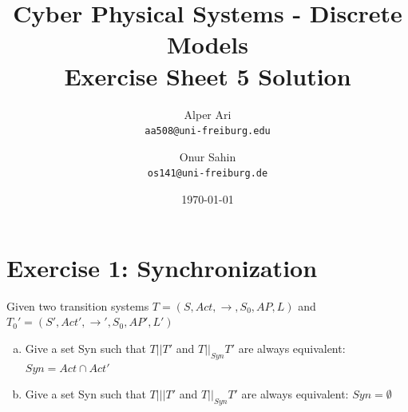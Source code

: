 \documentclass{article}
\title{
Cyber Physical Systems - Discrete Models \\
[0.2em]Exercise Sheet 5 Solution
}
\author{
  Alper Ari\\
  \texttt{aa508@uni-freiburg.edu}
  \and
  Onur Sahin\\
  \texttt{os141@uni-freiburg.de}
}
\date{\today}
\begin{document}
\maketitle

\section*{Exercise 1: Synchronization}
Given two transition systems $T = (S, Act, \longrightarrow, S_0, AP, L)$ and $T_0' = (S', Act', \longrightarrow ', S_0, AP', L')$ \\

\begin{enumerate}[(a)]
     \item{Give a set Syn such that $T||T'$ and $T ||_{Syn} T'$ are always equivalent:} $Syn = Act \cap Act'$
     \item{Give a set Syn such that $T|||T'$ and $T ||_{Syn} T'$ are always equivalent:} $Syn = \emptyset$
\end{enumerate}
\end{document}
